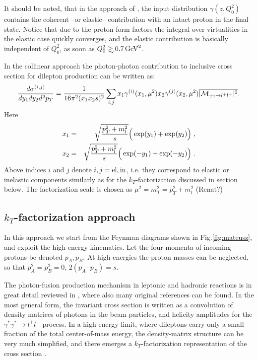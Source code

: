 It should be noted, that in the approach of
\cite{Martin:2004dh,Martin:2014nqa}, the input distribution $\gamma(z,Q_0^2)$ contains the coherent --or elastic-- contribution with an intact proton in the final state.
Notice that due to the proton form factors the integral over
virtualities in the elastic case quickly converges, and the elastic
contribution is basically independent of $Q_0^2$, as soon as $Q_0^2 \gsim 0.7 \, \rm{GeV}^2$.


In the collinear approach the photon-photon contribution
to inclusive cross section for dilepton production can be written as:
%
\begin{equation}
{d \sigma^{(i,j)} \over d y_1 d y_2 d^2 p_T} 
= {1 \over 16 \pi^2 (x_1 x_2 s)^2}\sum_{i,j} 
x_1 \gamma^{(i)}(x_1,\mu^2) 
x_2 \gamma^{(j)}(x_2,\mu^2)
\overline{ |{\cal M}_{\gamma \gamma \rightarrow l^+ l^-}|^2 }.
\label{collinear_factorization_formula}
\end{equation}
%
Here 
%
\begin{eqnarray}
 x_1 &=&  \sqrt{p_T^2 + m_l^2 \over s} 
\Big( \exp(y_1) + \exp(y_2) \Big) \; , \nonumber \\
 x_2 &=&  \sqrt{p_T^2 + m_l^2 \over s} 
\Big( \exp(-y_1) + \exp(-y_2) \Big) \; . 
\end{eqnarray}
Above indices $i$ and $j$ denote $i,j = \rm{el, in}$, i.e. they
correspond to elastic or inelastic components similarly as for 
the $k_T$-factorization discussed in section below.
The factorization scale is chosen as $\mu^2 = m_T^2 = p_T^2 + m_l^2$ (Renat?)

\subsection{$k_T$-factorization approach}

In this approach we start from the Feynman diagrams shown in Fig.\ref{fig:mateusz},
and exploit the high-energy kinematics.
Let the four-momenta of incoming protons be denoted $p_A,p_B$. At high energies 
the proton masses can be neglected, so that $p_A^2 = p_B^2 =0, \,  2 (p_A\cdot p_B) =s$.


The photon-fusion production mechanism in leptonic and hadronic reactions
is in great detail reviewed in \cite{Budnev:1974de}, where also many original
references can be found. In the most general form, the invariant cross section
is written as a convolution of density matrices of photons in the beam particles,
and helicity amplitudes for the $\gamma^* \gamma^* \to l^+ l^-$ process.
In a high energy limit, where dileptons carry only a small fraction of the 
total center-of-mass energy, the density-matrix structure can be very much
simplified, and there emerges a $k_T$-factorization representation of the
cross section \cite{daSilveira:2014jla}.

